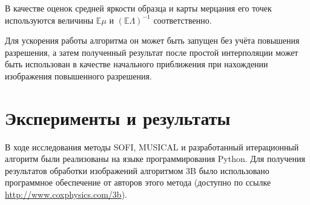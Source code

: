 
В качестве оценок средней яркости образца и карты мерцания его точек используются величины $\mathbb{E}\mu$ и $\left(\mathbb{E}\Lambda\right)^{-1}$ соответственно.

Для ускорения работы алгоритма он может быть запущен без учёта повышения разрешения, а затем полученный результат после простой интерполяции может быть использован в качестве начального приближения при нахождении изображения повышенного разрешения.

\section{Эксперименты и результаты}

В ходе исследования методы SOFI, MUSICAL и разработанный итерационный алгоритм были реализованы на языке программирования Python. Для получения результатов обработки изображений алгоритмом 3B было использовано программное обеспечение от авторов этого метода (доступно по ссылке \url{http://www.coxphysics.com/3b}).

